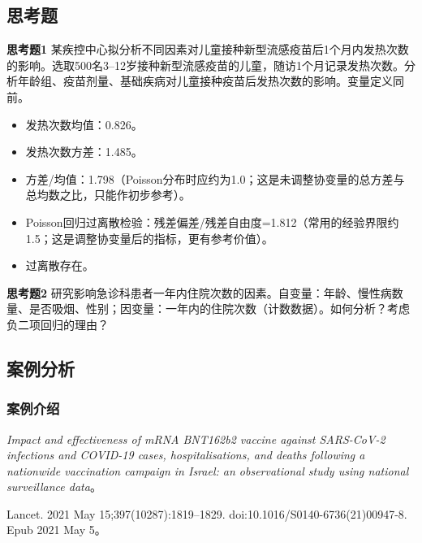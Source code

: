 \subsection{思考题}
\textbf{思考题1} 某疾控中心拟分析不同因素对儿童接种新型流感疫苗后1个月内发热次数的影响。选取500名3--12岁接种新型流感疫苗的儿童，随访1个月记录发热次数。分析年龄组、疫苗剂量、基础疾病对儿童接种疫苗后发热次数的影响。变量定义同前。
\begin{itemize}
\item 发热次数均值：0.826。
\item 发热次数方差：1.485。
\item 方差/均值：1.798（Poisson分布时应约为1.0；这是未调整协变量的总方差与总均数之比，只能作初步参考）。
\item Poisson回归过离散检验：残差偏差/残差自由度=1.812（常用的经验界限约1.5；这是调整协变量后的指标，更有参考价值）。
\item 过离散存在。
\end{itemize}
\textbf{思考题2} 研究影响急诊科患者一年内住院次数的因素。自变量：年龄、慢性病数量、是否吸烟、性别；因变量：一年内的住院次数（计数数据）。如何分析？考虑负二项回归的理由？
\subsection{案例分析}
\subsubsection{案例介绍}
\textit{Impact and effectiveness of mRNA BNT162b2 vaccine against SARS-CoV-2 infections and COVID-19 cases, hospitalisations, and deaths following a nationwide vaccination campaign in Israel: an observational study using national surveillance data}。

Lancet. 2021 May 15;397(10287):1819--1829. doi:10.1016/S0140-6736(21)00947-8. Epub 2021 May 5。

